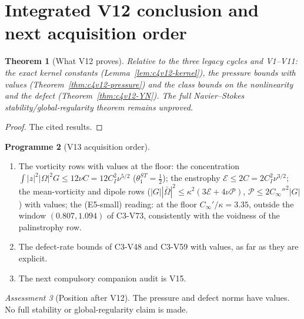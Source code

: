 \documentclass[11pt]{article}
\theoremstyle{plain}
\newtheorem{theorem}{Theorem}[section]
\theoremstyle{definition}
\newtheorem{programme}[theorem]{Programme}
\theoremstyle{remark}
\newtheorem{assessment}[theorem]{Assessment}
\begin{document}
\section{Integrated V12 conclusion and next acquisition order}
\label{sec:c4v12-conclusion}

\begin{theorem}[What V12 proves]
\label{thm:c4v12-conclusion}
Relative to the three legacy cycles and V1--V11: the exact kernel
constants (Lemma~\ref{lem:c4v12-kernel}), the pressure bounds with
values (Theorem~\ref{thm:c4v12-pressure}) and the class bounds on the
nonlinearity and the defect (Theorem~\ref{thm:c4v12-YN}).  The full
Navier--Stokes stability/global-regularity theorem remains
unproved.
\end{theorem}

\begin{proof}
The cited results.
\end{proof}

\begin{programme}[V13 acquisition order]
\label{prog:c4v13}
\begin{enumerate}[label=\textup{(AC\arabic*)},leftmargin=4.8em]
\item The vorticity rows with values at the floor: the concentration
      \(\int|z|^2|\Omega|^2G\le12\nu C=12C_I^2\nu^{5/2}\) (\(\theta_1^{ST}=\frac12\)); the enstrophy
      \(\mathcal E\le2C=2C_I^2\nu^{3/2}\); the mean-vorticity and dipole rows
      (\(|G||\bar\Omega|^2\le\kappa^2(3\mathcal E+4\nu\mathcal P)\), \(\mathcal P\le2C_\infty''^2|G|\)) with values; the
      (E5-small) reading: at the floor \(C_\infty'/\kappa=3.35\), outside the
      window \((0.807,1.094)\) of C3-V73, consistently with the voidness
      of the palinstrophy row.
\item The defect-rate bounds of C3-V48 and C3-V59 with values, as
      far as they are explicit.
\item The next compulsory companion audit is V15.
\end{enumerate}
\end{programme}

\begin{assessment}[Position after V12]
\label{ass:c4v12-position}
The pressure and defect norms have values.  No full stability or
global-regularity claim is made.
\end{assessment}
\end{document}
